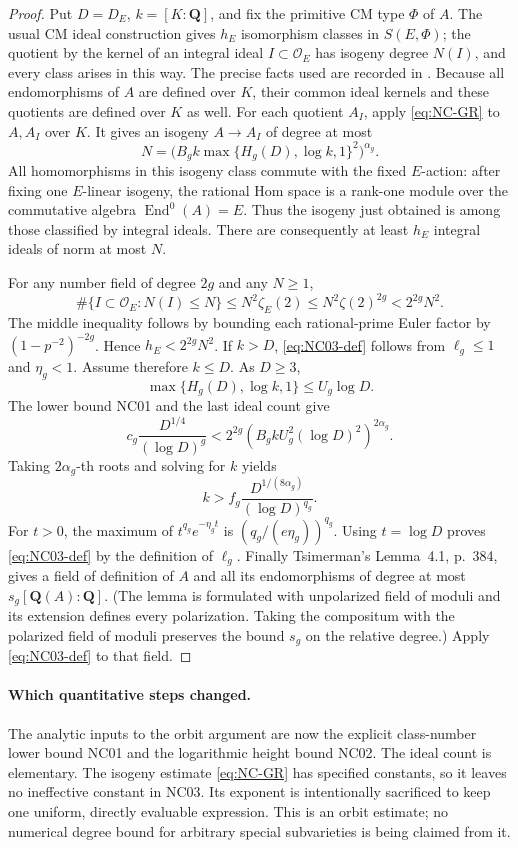 \documentclass[11pt]{article}
\theoremstyle{remark}
\begin{document}
\begin{proof}
Put $D=D_E$, $k=[K:\mathbf Q]$, and fix the primitive CM type $\Phi$
of $A$.  The usual CM ideal construction gives $h_E$ isomorphism
classes in $S(E,\Phi)$; the quotient by the kernel of an integral ideal
$I\subset\mathcal O_E$ has isogeny degree $N(I)$, and every class
arises in this way.  The precise facts used are recorded in
\cite[\S2.2, p.~382, proof of Proposition~2.2]{NC-Tsimerman2018}.
Because all endomorphisms of $A$ are defined over $K$, their common
ideal kernels and these quotients are defined over $K$ as well.
For each quotient $A_I$, apply \eqref{eq:NC-GR} to $A,A_I$ over $K$.
It gives an isogeny $A\to A_I$ of degree at most
\[
 N=\bigl(B_gk\max\{H_g(D),\log k,1\}^{2}\bigr)^{\alpha_g}.
\]
All homomorphisms in this isogeny class commute with the fixed
$E$-action: after fixing one $E$-linear isogeny, the rational Hom space
is a rank-one module over the commutative algebra
$\operatorname{End}^0(A)=E$.  Thus the isogeny just obtained is among
those classified by integral ideals.  There are consequently at least
$h_E$ integral ideals of norm at most $N$.

For any number field of degree $2g$ and any $N\geq1$,
\[
 \#\{I\subset\mathcal O_E:N(I)\leq N\}
 \leq N^2\zeta_E(2)
 \leq N^2\zeta(2)^{2g}<2^{2g}N^2.
\]
The middle inequality follows by bounding each rational-prime Euler
factor by $(1-p^{-2})^{-2g}$.  Hence $h_E<2^{2g}N^2$.
If $k>D$, \eqref{eq:NC03-def} follows from $\ell_g\leq1$ and
$\eta_g<1$.  Assume therefore $k\leq D$.  As $D\geq3$,
\[
 \max\{H_g(D),\log k,1\}\leq U_g\log D.
\]
The lower bound NC01 and the last ideal count give
\[
 c_g\frac{D^{1/4}}{(\log D)^g}
 <2^{2g}(B_gkU_g^2(\log D)^2)^{2\alpha_g}.
\]
Taking $2\alpha_g$-th roots and solving for $k$ yields
\[
 k>f_g\frac{D^{1/(8\alpha_g)}}{(\log D)^{q_g}}.
\]
For $t>0$, the maximum of $t^{q_g}e^{-\eta_gt}$ is
$(q_g/(e\eta_g))^{q_g}$.  Using $t=\log D$ proves
\eqref{eq:NC03-def} by the definition of $\ell_g$.
Finally Tsimerman's Lemma~4.1, p.~384, gives a field of definition of
$A$ and all its endomorphisms of degree at most
$s_g[\mathbf Q(A):\mathbf Q]$.  (The lemma is formulated with
unpolarized field of moduli and its extension defines every
polarization.  Taking the compositum with the polarized field of
moduli preserves the bound $s_g$ on the relative degree.)
Apply \eqref{eq:NC03-def} to that field.
\end{proof}

\paragraph{Which quantitative steps changed.}
The analytic inputs to the orbit argument are now the explicit
class-number lower bound NC01 and the logarithmic height bound NC02.
The ideal count is elementary.  The isogeny estimate
\eqref{eq:NC-GR} has specified constants, so it leaves no ineffective
constant in NC03.  Its exponent is intentionally sacrificed to keep
one uniform, directly evaluable expression.  This is an orbit estimate;
no numerical degree bound for arbitrary special subvarieties is being
claimed from it.
\end{document}
